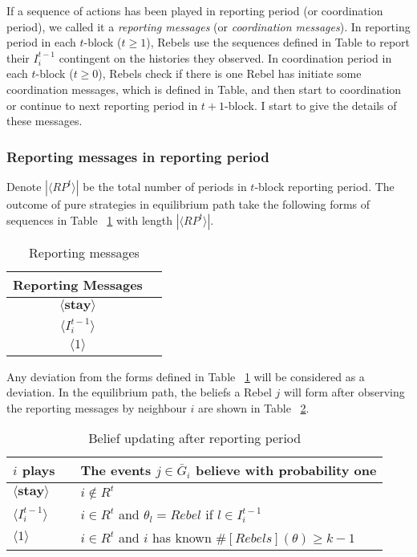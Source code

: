 \documentclass[12pt,letter]{article}
\theoremstyle{definition}
\theoremstyle{remark}
\theoremstyle{claim}
\begin{document}
If a sequence of actions has been played in reporting period (or coordination period), we called it a \textit{reporting messages} (or \textit{coordination messages}). In reporting period in each $t$-block ($t\geq 1$), Rebels use the sequences defined in Table to report their $I^{t-1}_i$ contingent on the histories they observed. In coordination period in each $t$-block ($t\geq 0$), Rebels check if there is one Rebel has initiate some coordination messages, which is defined in Table, and then start to coordination or continue to next reporting period in $t+1$-block. I start to give the details of these messages.



\subsubsection*{Reporting messages in reporting period}

Denote $|\langle RP^t \rangle|$ be the total number of periods in $t$-block reporting period. The outcome of pure strategies in equilibrium path take the following forms of sequences in Table ~\ref{Table_msg_reporting} with length $|\langle RP^t \rangle|$.

\begin{table}[t]
\caption{Reporting messages}
\label{Table_msg_reporting}
\begin{center}
\begin{tabular}{c c }
Reporting Messages 		&   \\
\hline
$\langle  \textbf{stay} \rangle$ 	& 	 \\
$\langle  {I^{t-1}_i} \rangle$ 		&   \\
$\langle 1 \rangle$ 		             &    
\end{tabular}
\end{center}
\end{table}
Any deviation from the forms defined in Table ~\ref{Table_msg_reporting} will be considered as a deviation. In the equilibrium path, the beliefs a Rebel $j$ will form after observing the reporting messages by neighbour $i$ are shown in Table ~\ref{Table_blf_up_reporting}.

\begin{table}[t]
\caption{Belief updating after reporting period}
\label{Table_blf_up_reporting}
\begin{center}
\begin{tabular}{l c l}
$i$ plays 		&  			& The events $j\in \bar{G}_i$ believe with probability one  \\
\hline
$\langle  \textbf{stay} \rangle$ 	& 			    & $i\notin R^t$  \\
$\langle  {I^{t-1}_i} \rangle$ 		&  			& $i\in R^t$ and $\theta_l=Rebel$ if $l\in I^{t-1}_i$      \\
$\langle 1 \rangle$ 		             &  			& $i\in R^t$ and $i$ has known $\#[Rebels](\theta)\geq k-1$ \\
\end{tabular}
\end{center}
\end{table}
\end{document}
